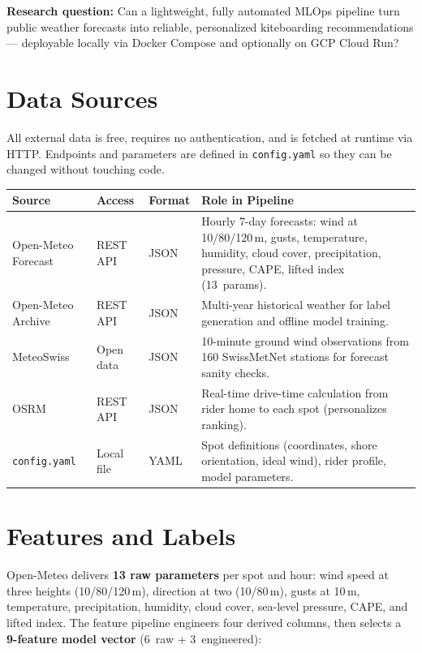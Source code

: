 \documentclass[11pt,a4paper]{article}
\begin{document}
\medskip
\noindent\textbf{Research question:} Can a lightweight, fully automated
MLOps pipeline turn public weather forecasts into reliable,
personalized kiteboarding recommendations --- deployable locally via
Docker Compose and optionally on GCP Cloud Run?

\section{Data Sources}

All external data is free, requires no authentication, and is fetched
at runtime via HTTP. Endpoints and parameters are defined in
\texttt{config.yaml} so they can be changed without touching code.

\begin{center}
\footnotesize
\begin{tabularx}{\linewidth}{l l l X}
\toprule
\textbf{Source} & \textbf{Access} & \textbf{Format} & \textbf{Role in Pipeline} \\
\midrule
Open-Meteo Forecast & REST\,API & JSON &
  Hourly 7-day forecasts: wind at 10/80/120\,m, gusts,
  temperature, humidity, cloud cover, precipitation,
  pressure, CAPE, lifted index (13~params). \\
Open-Meteo Archive  & REST\,API & JSON &
  Multi-year historical weather for label
  generation and offline model training. \\
MeteoSwiss          & Open data & JSON &
  10-minute ground wind observations from 160 SwissMetNet
  stations for forecast sanity checks. \\
OSRM                & REST\,API & JSON &
  Real-time drive-time calculation from rider home
  to each spot (personalizes ranking). \\
\texttt{config.yaml} & Local file & YAML &
  Spot definitions (coordinates, shore orientation,
  ideal wind), rider profile, model parameters. \\
\bottomrule
\end{tabularx}
\end{center}

\section{Features and Labels}

Open-Meteo delivers \textbf{13 raw parameters} per spot and hour:
wind speed at three heights (10/80/120\,m), direction at two
(10/80\,m), gusts at 10\,m, temperature, precipitation, humidity,
cloud cover, sea-level pressure, CAPE, and lifted index.
The feature pipeline engineers four derived columns, then selects a
\textbf{9-feature model vector} (6~raw + 3~engineered):
\end{document}

